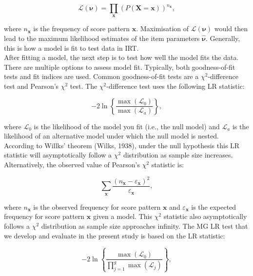 \documentclass[Royal,sageapa,times,doublespace]{sagej}
\begin{document}
\begin{equation}
\mathcal{L}(\boldsymbol{\nu}) = \prod_{\boldsymbol{x}} (P(\boldsymbol{X} = \boldsymbol{x}))^{n_{\boldsymbol{x}}},
\end{equation}

where $n_{\boldsymbol{x}}$ is the frequency of score pattern $\boldsymbol{x}$. Maximisation of $\mathcal{L}(\boldsymbol{\nu})$ would then lead to the maximum likelihood estimates of the item parameters $\boldsymbol{\hat{\nu}}$. Generally, this is how a model is fit to test data in IRT. \\
\indent After fitting a model, the next step is to test how well the model fits the data. There are multiple options to assess model fit. Typically, both goodness-of-fit tests and fit indices are used. Common goodness-of-fit tests are a $\chi^2$-difference test and Pearson's $\chi^2$ test. The $\chi^2$-difference test uses the following LR statistic:

\begin{equation}
- 2 \ln \left \{ \frac{\max(\mathcal{L}_0)}{\max(\mathcal{L}_a)} \right \},
\end{equation}

where $\mathcal{L}_0$ is the likelihood of the model you fit (i.e., the null model) and $\mathcal{L}_a$ is the likelihood of an alternative model under which the null model is nested. According to Willks' theorem (Wilks, 1938), under the null hypothesis this LR statistic will asymptotically follow a $\chi^2$ distribution as sample size increases. Alternatively, the observed value of Pearson's $\chi^2$ statistic is:

\begin{equation}
\sum_{\boldsymbol{x}} \frac{(n_{\boldsymbol{x}} - \varepsilon_{\boldsymbol{x}})^2}{\varepsilon_{\boldsymbol{x}}},
\end{equation}

where $n_{\boldsymbol{x}}$ is the observed frequency for score pattern $\boldsymbol{x}$ and $\varepsilon_{\boldsymbol{x}}$ is the expected frequency for score pattern $\boldsymbol{x}$ given a model. This $\chi^2$ statistic also asymptotically follows a $\chi^2$ distribution as sample size approaches infinity. The MG LR test that we develop and evaluate in the present study is based on the LR statistic: 

\begin{equation}
-2 \ln \left \{ \frac{\max(\mathcal{L}_0)}{\prod_{j = 1}^g \max(\mathcal{L}_j)} \right \},
\end{equation}
 
\end{document}
